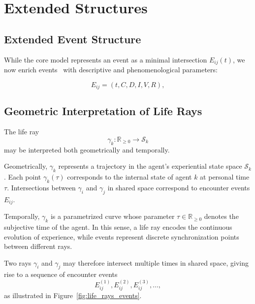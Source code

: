 \documentclass[12pt,a4paper]{article}
\begin{document}
\section{Extended Structures}

\subsection{Extended Event Structure}

While the core model represents an event as a minimal intersection $E_{ij}(t)$,
we now enrich events~
with descriptive and phenomenological parameters:

\begin{equation}
E_{ij} = (t, C, D, I, V, R),
\end{equation}

\subsection{Geometric Interpretation of Life Rays}

The life ray
\[
\gamma_k : \mathbb{R}_{\ge 0} \to \mathcal{S}_k
\]
may be interpreted both geometrically and temporally.

Geometrically, $\gamma_k$ represents a trajectory in the agent’s experiential state space
$\mathcal{S}_k$. Each point $\gamma_k(\tau)$ corresponds to the internal state of agent $k$
at personal time $\tau$. Intersections between $\gamma_i$ and $\gamma_j$ in shared space
correspond to encounter events $E_{ij}$.

Temporally, $\gamma_k$ is a parametrized curve whose parameter $\tau \in \mathbb{R}_{\ge 0}$
denotes the subjective time of the agent. In this sense, a life ray encodes the continuous
evolution of experience, while events represent discrete synchronization points between
different rays.

Two rays $\gamma_i$ and $\gamma_j$ may therefore intersect multiple times in shared space,
giving rise to a sequence of encounter events
\[
E_{ij}^{(1)}, E_{ij}^{(2)}, E_{ij}^{(3)}, \dots,
\]
as illustrated in Figure~\ref{fig:life_rays_events}.
\end{document}
